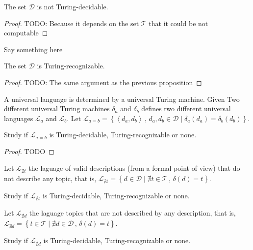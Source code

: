 \begin{proposition}
The set $\mathcal{D}$ is not Turing-decidable.
\end{proposition}
\begin{proof}
{\color{red} TODO: Because it depends on the set $\mathcal{T}$ that it could be not computable}
\end{proof}

Say something here

\begin{proposition}
The set $\mathcal{D}$ is Turing-recognizable.
\end{proposition}
\begin{proof}
{\color{red} TODO: The same argument as the previous proposition}
\end{proof}

A universal language is determined by a universal Turing machine. Given Two different universal Turing machines $\delta_{a}$ and $\delta_{b}$ defines two different universal languages $\mathcal{L}_{a}$ and $\mathcal{L}_{b}$. Let $\mathcal{L}_{a=b}=\left\{ \left\langle d_{a},d_{b}\right\rangle \,,\,d_{a},d_{b}\in\mathcal{D}\mid\delta_{a}\left(d_{a}\right)=\delta_{b}\left(d_{b}\right)\right\}$.

\begin{proposition}
Study if $\mathcal{L}_{a=b}$ is Turing-decidable, Turing-recognizable or none.
\end{proposition}
\begin{proof}
{\color{red} TODO}
\end{proof}

Let $\mathcal{L}_{\nexists t}$ the laguage of valid descriptions (from a formal point of view) that do not describe any topic, that is, $\mathcal{L}_{\nexists t}=\left\{ d\in\mathcal{D}\mid\nexists t\in\mathcal{T}\,,\,\delta\left(d\right)=t\right\}$.

\begin{proposition}
Study if $\mathcal{L}_{\nexists t}$ is Turing-decidable, Turing-recognizable or none.
\end{proposition}

Let $\mathcal{L}_{\nexists d}$ the laguage topics that are not described by any description, that is, $\mathcal{L}_{\nexists d}=\left\{ t\in\mathcal{T}\mid\nexists d\in\mathcal{D}\,,\,\delta\left(d\right)=t\right\}$.

\begin{proposition}
Study if $\mathcal{L}_{\nexists d}$ is Turing-decidable, Turing-recognizable or none.
\end{proposition}

